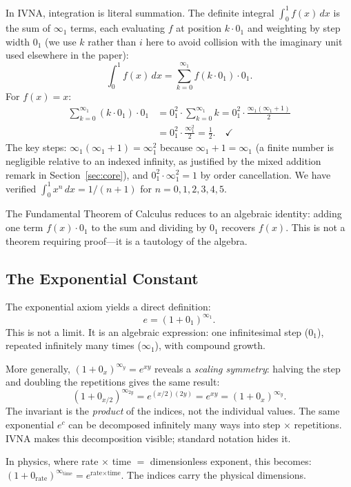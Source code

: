 \documentclass[12pt]{article}
\theoremstyle{definition}
\theoremstyle{remark}
\newcommand{\vz}[1]{0_{#1}}             %
\newcommand{\vi}[1]{\infty_{#1}}        %
\newcommand{\vzn}[2]{0^{#1}_{#2}}       %
\newcommand{\vin}[2]{\infty^{#1}_{#2}}  %
\begin{document}
In IVNA, integration is literal summation. The definite integral
$\int_0^1 f(x)\,dx$ is the sum of $\vi{1}$ terms, each evaluating
$f$ at position $k \cdot \vz{1}$ and weighting by step width $\vz{1}$
(we use $k$ rather than $i$ here to avoid collision with the imaginary
unit used elsewhere in the paper):
\[
\int_0^1 f(x)\,dx = \sum_{k=0}^{\vi{1}} f(k \cdot \vz{1}) \cdot \vz{1}.
\]
For $f(x) = x$:
\begin{align*}
\sum_{k=0}^{\vi{1}} (k \cdot \vz{1}) \cdot \vz{1}
&= \vzn{2}{1} \cdot \sum_{k=0}^{\vi{1}} k
= \vzn{2}{1} \cdot \frac{\vi{1}(\vi{1}+1)}{2} \\
&= \vzn{2}{1} \cdot \frac{\vin{2}{1}}{2}
= \frac{1}{2}. \quad\checkmark
\end{align*}
The key steps: $\vi{1}(\vi{1}+1) = \vin{2}{1}$ because $\vi{1} + 1 = \vi{1}$
(a finite number is negligible relative to an indexed infinity, as justified
by the mixed addition remark in Section~\ref{sec:core}), and
$\vzn{2}{1} \cdot \vin{2}{1} = 1$ by order cancellation.
We have verified $\int_0^1 x^n\,dx = 1/(n+1)$ for $n = 0, 1, 2, 3, 4, 5$.

The Fundamental Theorem of Calculus reduces to an algebraic identity:
adding one term $f(x) \cdot \vz{1}$ to the sum and dividing by $\vz{1}$
recovers $f(x)$. This is not a theorem requiring proof---it is a
tautology of the algebra.

\subsection{The Exponential Constant}

The exponential axiom yields a direct definition:
\[
e = (1 + \vz{1})^{\vi{1}}.
\]
This is not a limit. It is an algebraic expression: one infinitesimal
step ($\vz{1}$), repeated infinitely many times ($\vi{1}$), with
compound growth.

More generally, $(1 + \vz{x})^{\vi{y}} = e^{xy}$ reveals a
\emph{scaling symmetry}: halving the step and doubling the repetitions
gives the same result:
\[
(1 + \vz{x/2})^{\vi{2y}} = e^{(x/2)(2y)} = e^{xy}
= (1 + \vz{x})^{\vi{y}}.
\]
The invariant is the \emph{product} of the indices, not the individual
values. The same exponential $e^c$ can be decomposed infinitely many
ways into step $\times$ repetitions. IVNA makes this decomposition
visible; standard notation hides it.

In physics, where rate $\times$ time $=$ dimensionless exponent,
this becomes: $(1 + \vz{\text{rate}})^{\vi{\text{time}}} =
e^{\text{rate} \times \text{time}}$. The indices carry the physical
dimensions.
\end{document}
